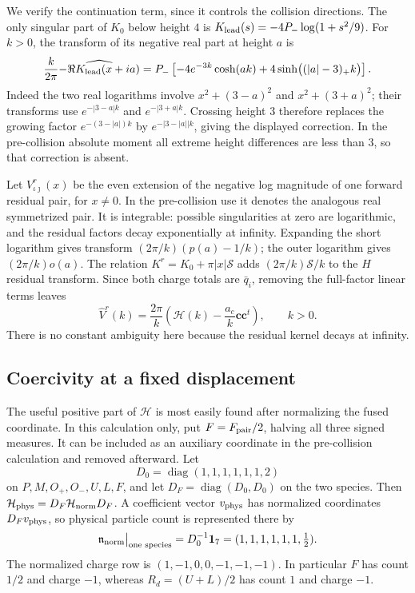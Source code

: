 We verify the continuation term, since it controls the collision directions. The only singular part of \(K_0\) below height \(4\) is
\(K_{\rm lead}(s)=-4P_-\log(1+s^2/9)\). For \(k>0\), the transform of its negative real part at height \(a\) is
\[
\frac{k}{2\pi}\widehat{-\Re K_{\rm lead}(x+ia)}
=P_-\left[-4e^{-3k}\cosh(ak)
+4\sinh\!\big((|a|-3)_+k\big)\right].
\]
Indeed the two real logarithms involve \(x^2+(3-a)^2\) and \(x^2+(3+a)^2\); their transforms use \(e^{-|3-a|k}\) and \(e^{-|3+a|k}\). Crossing height \(3\) therefore replaces the growing factor \(e^{-(3-|a|)k}\) by \(e^{-|3-|a||k}\), giving the displayed correction. In the pre-collision absolute moment all extreme height differences are less than \(3\), so that correction is absent.

Let \(V^r_{\iota\jmath}(x)\) be the even extension of the negative log magnitude of one forward residual pair, for \(x\ne0\). In the pre-collision use it denotes the analogous real symmetrized pair. It is integrable: possible singularities at zero are logarithmic, and the residual factors decay exponentially at infinity. Expanding the short logarithm gives transform \((2\pi/k)(p(a)-1/k)\); the outer logarithm gives \((2\pi/k)o(a)\). The relation \(K^r=K_0+\pi|x|\mathcal S\) adds \((2\pi/k)\mathcal S/k\) to the \(H\) residual transform. Since both charge totals are \(\bar q_i\), removing the full-factor linear terms leaves
\begin{equation}\label{j:residual-symbol}
\widehat V^r(k)=\frac{2\pi}{k}
\left(\mathcal H(k)-\frac{a_c}{k}\boldsymbol c\boldsymbol c^t\right),
\qquad k>0.
\end{equation}
There is no constant ambiguity here because the residual kernel decays at infinity.

\subsection{Coercivity at a fixed displacement}

The useful positive part of \(\mathcal H\) is most easily found after normalizing the fused coordinate. In this calculation only, put \(F=F_{\rm pair}/2\), halving all three signed measures. It can be included as an auxiliary coordinate in the pre-collision calculation and removed afterward. Let
\[
D_0=\operatorname{diag}(1,1,1,1,1,1,2)
\]
on \(P,M,O_+,O_-,U,L,F\), and let \(D_F=\operatorname{diag}(D_0,D_0)\) on the two species. Then
\(\mathcal H_{\rm phys}=D_F\mathcal H_{\rm norm}D_F\). A coefficient vector \(v_{\rm phys}\) has normalized coordinates \(D_Fv_{\rm phys}\), so physical particle count is represented there by
\[
\mathfrak n_{\rm norm}\big|_{\text{one species}}
=D_0^{-1}\mathbf1_7=(1,1,1,1,1,1,\tfrac12).
\]
The normalized charge row is \((1,-1,0,0,-1,-1,-1)\). In particular \(F\) has count \(1/2\) and charge \(-1\), whereas \(R_d=(U+L)/2\) has count \(1\) and charge \(-1\).

